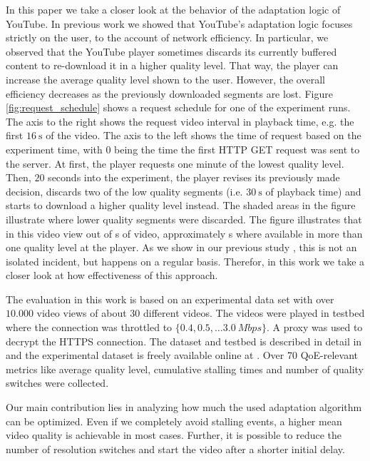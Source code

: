 In this paper we take a closer look at the behavior of the adaptation logic of YouTube.
In previous work we showed that YouTube's adaptation logic focuses strictly on the user, to the account of network efficiency.
In particular, we observed that the YouTube player sometimes discards its currently buffered content to re-download it in a higher quality level.
That way, the player can increase the average quality level shown to the user.
However, the overall efficiency decreases as the previously downloaded segments are lost.
Figure \ref{fig:request_schedule} shows a request schedule for one of the experiment runs.
The axis to the right shows the request video interval in playback time, e.g. the first $\SI{16}{\second}$ of the video.
The axis to the left shows the time of request based on the experiment time, with $0$ being the time the first HTTP GET request was sent to the server.
At first, the player requests one minute of the lowest quality level.
Then, ${20}$ seconds into the experiment, the player revises its previously made decision, discards two of the low quality segments (i.e. $\SI{30}{\second}$ of playback time) and starts to download a higher quality level instead.
The shaded areas in the figure illustrate where lower quality segments were discarded.
The figure illustrates that in this video view out of \unit[105]{s} of video, approximately \unit[60]{s} where available in more than one quality level at the player. 
As we show in our previous study \cite{sieber16sacrificing}, this is not an isolated incident, but happens on a regular basis. 
Therefor, in this work we take a closer look at how effectiveness of this approach.

The evaluation in this work is based on an experimental data set with over $10.000$ video views of about $30$ different videos.
The videos were played in testbed where the connection was throttled to $\{0.4, 0.5, \dots \SI{3.0}{Mbps}\}$.
A proxy was used to decrypt the HTTPS connection.
The dataset and testbed is described in detail in \cite{sieber16sacrificing,sieber15costaggressive} and the experimental dataset is freely available online at \cite{traces}. 
Over 70 QoE-relevant metrics like average quality level, cumulative stalling times and number of quality switches were collected.

Our main contribution lies in analyzing how much the used adaptation algorithm can be optimized. Even if we completely avoid stalling events, a higher mean video quality is achievable in most cases. Further, it is possible to reduce the number of resolution switches and start the video after a shorter initial delay.

